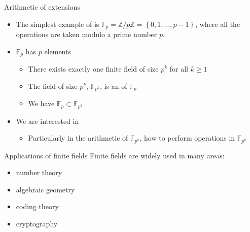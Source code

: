 \documentclass[xcolor=x11names,compress, aspectratio=43]{beamer}
\begin{document}
\begin{frame}{Arithmetic of extensions}
  \begin{itemize}
    \item The simplest example of  is $\mathbb{F}_p =
      \mathbb{Z}/p\mathbb{Z}=\left\{ 0, 1, \dots, p-1 \right\}$, where all the
      operations are taken modulo a prime number $p$.
    \item $\mathbb{F}_p$ has $p$ elements
      \begin{itemize}
      \item There exists exactly one finite field of size $p^k$ for all $k\geq1$
      \item The field of size $p^k$, $\mathbb{F}_{p^{k}}$, is an  of
        $\mathbb{F}_p$
      \item We have $\mathbb{F}_p\subset\mathbb{F}_{p^k}$
      \end{itemize}
    \item We are interested in 
      \begin{itemize}
        \item Particularly in the arithmetic of $\mathbb{F}_{p^{k}}$, \ie how to
          perform operations in $\mathbb{F}_{p^{k}}$ 
      \end{itemize}
  \end{itemize}
\end{frame}

\begin{frame}{Applications of finite fields}
  Finite fields are widely used in many areas:
  \begin{itemize}
    \item number theory
    \item algebraic geometry
    \item coding theory
    \item cryptography
  \end{itemize}
\end{frame}
\end{document}
